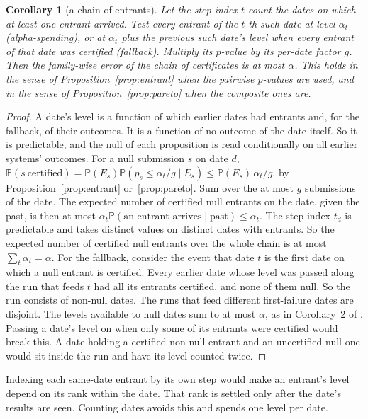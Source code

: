 \documentclass[11pt]{article}
\renewcommand{\Pr}{\mathbb{P}}
\newtheorem{corollary}{Corollary}
\begin{document}
\begin{corollary}[a chain of entrants]
\label{cor:chain}
Let the step index $t$ count the dates on which at least one entrant arrived. Test every entrant of the $t$-th such date at level $\alpha_t$ (alpha-spending), or at $\alpha_t$ plus the previous such date's level when every entrant of that date was certified (fallback). Multiply its $p$-value by its per-date factor $g$. Then the family-wise error of the chain of certificates is at most $\alpha$. This holds in the sense of Proposition~\ref{prop:entrant} when the pairwise $p$-values are used, and in the sense of Proposition~\ref{prop:pareto} when the composite ones are.
\end{corollary}
\begin{proof}
A date's level is a function of which earlier dates had entrants and, for the fallback, of their outcomes. It is a function of no outcome of the date itself. So it is predictable, and the null of each proposition is read conditionally on all earlier systems' outcomes. For a null submission $s$ on date $d$, $\Pr(s\ \text{certified})=\Pr(E_s)\Pr(p_s\le\alpha_t/g\mid E_s)\le\Pr(E_s)\,\alpha_t/g$, by Proposition~\ref{prop:entrant} or~\ref{prop:pareto}. Sum over the at most $g$ submissions of the date. The expected number of certified null entrants on the date, given the past, is then at most $\alpha_t\Pr(\text{an entrant arrives}\mid\text{past})\le\alpha_t$. The step index $t_d$ is predictable and takes distinct values on distinct dates with entrants. So the expected number of certified null entrants over the whole chain is at most $\sum_t\alpha_t=\alpha$. For the fallback, consider the event that date $t$ is the first date on which a null entrant is certified. Every earlier date whose level was passed along the run that feeds $t$ had all its entrants certified, and none of them null. So the run consists of non-null dates. The runs that feed different first-failure dates are disjoint. The levels available to null dates sum to at most $\alpha$, as in Corollary~2 of \citet{opoku2026records}. Passing a date's level on when only some of its entrants were certified would break this. A date holding a certified non-null entrant and an uncertified null one would sit inside the run and have its level counted twice.
\end{proof}
Indexing each same-date entrant by its own step would make an entrant's level depend on its rank within the date. That rank is settled only after the date's results are seen. Counting dates avoids this and spends one level per date.
\end{document}
